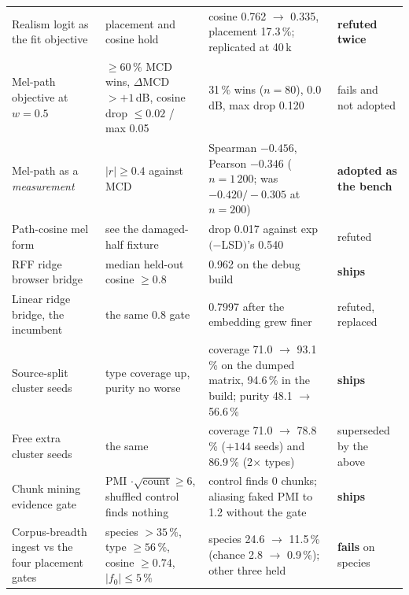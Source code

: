 \documentclass[10pt,twocolumn,a4paper]{article}
\begin{document}
\begin{longtable}{L{3.9cm} L{3.6cm} L{4.6cm} L{2.5cm}}
Realism logit as the fit objective & placement and cosine hold & cosine 0.762 $\to$ 0.335, placement 17.3\,\%; replicated at 40\,k & \textbf{refuted twice} \\
Mel-path objective at $w = 0.5$ & $\ge 60\,\%$ MCD wins, $\Delta$MCD $> +1$\,dB, cosine drop $\le 0.02$ / max 0.05 & 31\,\% wins ($n = 80$), 0.0\,dB, max drop 0.120 & fails and not adopted \\
Mel-path as a \emph{measurement} & $|r| \ge 0.4$ against MCD & Spearman $-0.456$, Pearson $-0.346$ ($n = 1\,200$; was $-0.420 / -0.305$ at $n = 200$) & \textbf{adopted as the bench} \\
Path-cosine mel form & see the damaged-half fixture & drop 0.017 against exp$(-$LSD$)$'s 0.540 & refuted \\

RFF ridge browser bridge & median held-out cosine $\ge 0.8$ & 0.962 on the debug build & \textbf{ships} \\
Linear ridge bridge, the incumbent & the same 0.8 gate & 0.7997 after the embedding grew finer & refuted, replaced \\

Source-split cluster seeds & type coverage up, purity no worse & coverage 71.0 $\to$ 93.1\,\% on the dumped matrix, 94.6\,\% in the build; purity 48.1 $\to$ 56.6\,\% & \textbf{ships} \\
Free extra cluster seeds & the same & coverage 71.0 $\to$ 78.8\,\% ($+144$ seeds) and 86.9\,\% (2$\times$ types) & superseded by the above \\
Chunk mining evidence gate & PMI $\cdot \sqrt{\text{count}} \ge 6$, shuffled control finds nothing & control finds 0 chunks; aliasing faked PMI to 1.2 without the gate & \textbf{ships} \\
Corpus-breadth ingest vs the four placement gates & species $> 35\,\%$, type $\ge 56\,\%$, cosine $\ge 0.74$, $|f_0| \le 5\,\%$ & species 24.6 $\to$ 11.5\,\% (chance 2.8 $\to$ 0.9\,\%); other three held & \textbf{fails} on species \\


\end{longtable}
\end{document}
